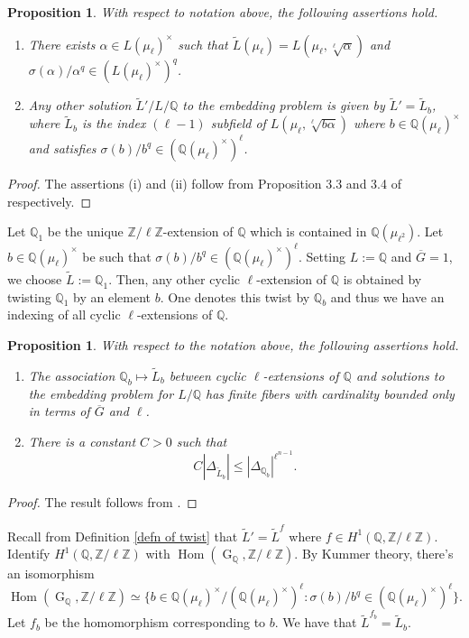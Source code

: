\documentclass[11pt,reqno]{amsart}
\newtheorem{proposition}[theorem]{Proposition}
\newcommand{\Z}{\mathbb{Z}}
\newcommand{\Q}{\mathbb{Q}}
\newcommand{\op}[1]{\operatorname{#1}}
\numberwithin{equation}{section}
\begin{document}
\begin{proposition}
   With respect to notation above, the following assertions hold.
\begin{enumerate}
    \item[(i)] There exists $\alpha\in L(\mu_\ell)^\times$ such that $\widetilde{L}(\mu_\ell)=L(\mu_\ell, \sqrt[\ell]{\alpha})$ and $\sigma(\alpha)/\alpha^q\in \left(L(\mu_\ell)^\times\right)^q$.
    \item[(ii)] Any other solution $\widetilde{L}'/L/\Q$ to the embedding problem is given by $\widetilde{L}'=\widetilde{L}_b$, where $\widetilde{L}_b$ is the index $(\ell-1)$ subfield of $L(\mu_\ell, \sqrt[\ell]{b\alpha})$ where $b\in \Q(\mu_\ell)^\times$ and satisfies $\sigma(b)/b^q\in (\Q(\mu_\ell)^\times)^\ell$. 
\end{enumerate}

\end{proposition}
\begin{proof}
    The assertions (i) and (ii) follow from Proposition 3.3 and 3.4 of \cite{klunersmalle} respectively.
\end{proof}
Let $\Q_1$ be the unique $\Z/\ell\Z$-extension of $\Q$ which is contained in $\Q(\mu_{\ell^2})$. Let $b\in \Q(\mu_\ell)^\times$ be such that $\sigma(b)/b^q\in (\Q(\mu_\ell)^\times)^\ell$. Setting $L:=\Q$ and $\overline{G}=1$, we choose $\widetilde{L}:=\Q_1$. Then, any other cyclic $\ell$-extension of $\Q$ is obtained by twisting $\Q_1$ by an element $b$. One denotes this twist by $\Q_b$ and thus we have an indexing of all cyclic $\ell$-extensions of $\Q$.
\begin{proposition}\label{KM result}
     With respect to the notation above, the following assertions hold. 
    \begin{enumerate}
   \item[(i)] The association $\Q_b\mapsto \widetilde{L}_b$ between cyclic $\ell$-extensions of $\Q$ and solutions to the embedding problem for $L/\Q$ has finite fibers with cardinality bounded only in terms of $\overline{G}$ and $\ell$.
   \item[(ii)] There is a constant $C>0$ such that 
\[C |\Delta_{\widetilde{L}_b}|\leq |\Delta_{\Q_b}|^{\ell^{n-1}}.\]
   \end{enumerate}
\end{proposition}
\begin{proof}
    The result follows from \cite[Proposition 3.5]{klunersmalle}.
\end{proof}

Recall from Definition \ref{defn of twist} that $\widetilde{L}'=\widetilde{L}^f$ where $f\in H^1(\Q, \Z/\ell\Z)$. Identify $H^1(\Q, \Z/\ell\Z)$ with $\op{Hom}(\op{G}_\Q, \Z/\ell\Z)$. By Kummer theory, there's an isomorphism
\[\op{Hom}(\op{G}_\Q, \Z/\ell\Z)\simeq \{b\in \Q(\mu_\ell)^\times/(\Q(\mu_\ell)^\times)^\ell: \sigma(b)/b^q\in (\Q(\mu_\ell)^\times)^\ell\}.\] Let $f_b$ be the homomorphism corresponding to $b$. We have that $\widetilde{L}^{f_b}=\widetilde{L}_b$.
\end{document}
